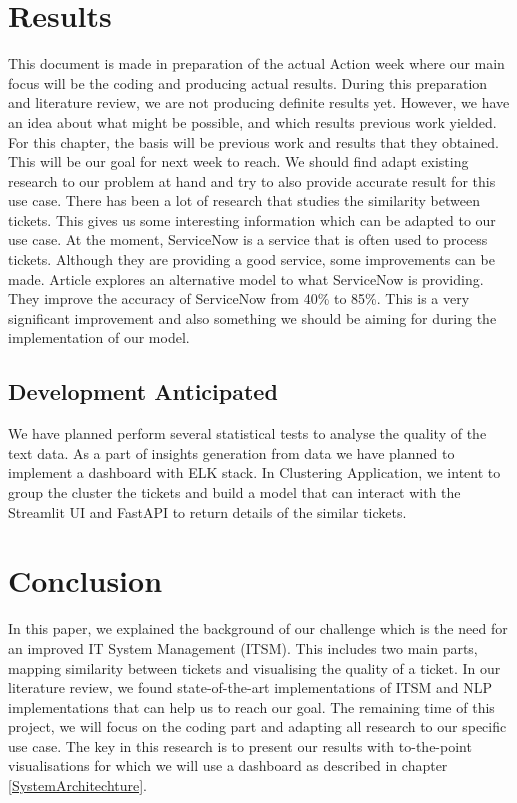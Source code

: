 \documentclass[a4paper,12pt]{report}
\begin{document}
    \chapter{Results}
    This document is made in preparation of the actual Action week where our main focus will be the coding and producing actual results. During this preparation and literature review, we are not producing definite results yet. However, we have an idea about what might be possible, and which results previous work yielded. For this chapter, the basis will be previous work and results that they obtained. This will be our goal for next week to reach. We should find adapt existing research to our problem at hand and try to also provide accurate result for this use case.
    \newline\newline
    There has been a lot of research that studies the similarity between tickets. This gives us some interesting information which can be adapted to our use case. At the moment, ServiceNow is a service that is often used to process tickets. Although they are providing a good service, some improvements can be made. Article\cite{Garrett2020} explores an alternative model to what ServiceNow is providing. They improve the accuracy of ServiceNow from 40\% to 85\%. This is a very significant improvement and also something we should be aiming for during the implementation of our model.

    \section{Development Anticipated}
    We have planned perform several statistical tests to analyse the quality of the text data.
    As a part of insights generation from data we have planned to implement a dashboard with ELK stack. In Clustering Application, we intent to group the cluster the tickets and build a model that can interact with the Streamlit UI and FastAPI to return details of the similar tickets.

    
    \chapter{Conclusion}
    In this paper, we explained the background of our challenge which is the need for an improved IT System Management (ITSM). This includes two main parts, mapping similarity between tickets and visualising the quality of a ticket. In our literature review, we found state-of-the-art implementations of ITSM and NLP implementations that can help us to reach our goal. The remaining time of this project, we will focus on the coding part and adapting all research to our specific use case. The key in this research is to present our results with to-the-point visualisations for which we will use a dashboard as described in chapter \vref{SystemArchitechture}.

    
    \nocite{*}

    
    

    
    \listoffigures
    
\end{document}

